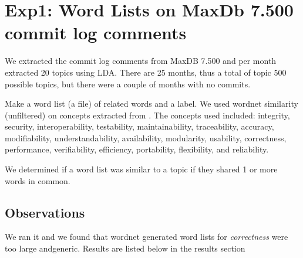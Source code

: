 \documentclass{article}
\begin{document}









\section{Exp1: Word Lists on MaxDb 7.500 commit log comments}

We extracted the commit log comments from MaxDB 7.500 and per month extracted 20 topics using LDA. There are 25 months, thus a total of topic 500 possible topics, but there were a couple of months with no commits.

Make a word list (a file) of related words and a label. We used
wordnet similarity (unfiltered) on concepts extracted from
\cite{5072519}.  The concepts used included: integrity, security,
interoperability, testability, maintainability, traceability,
accuracy, modifiability, understandability, availability, modularity,
usability, correctness, performance, verifiability, efficiency,
portability, flexibility, and reliability.

We determined if a word list was similar to a topic if they shared 1
or more words in common.

\subsection{Observations}

We ran it and we found that wordnet generated word lists for
\emph{correctness} were too large andgeneric. Results are listed below
in the results section
\end{document}
